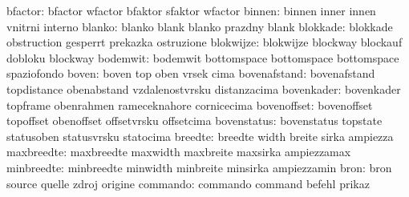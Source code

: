                   bfactor: bfactor                   wfactor
                           bfaktor                   sfaktor
                           wfactor                   %
                   binnen: binnen                    inner
                           innen                     vnitrni
                           interno
                   blanko: blanko                    blank
                           blanko                    prazdny
                           blank                     %
                 blokkade: blokkade                  obstruction
                           gesperrt                  prekazka
                           ostruzione
                blokwijze: blokwijze                 blockway
                           blockauf                  dobloku
                           blockway                  %
                 bodemwit: bodemwit                  bottomspace
                           bottomspace               bottomspace
                           spaziofondo
                    boven: boven                     top
                           oben                      vrsek
                           cima
             bovenafstand: bovenafstand              topdistance
                           obenabstand               vzdalenostvrsku
                           distanzacima
               bovenkader: bovenkader                topframe
                           obenrahmen                rameceknahore
                           cornicecima
              bovenoffset: bovenoffset               topoffset
                           obenoffset                offsetvrsku
                           offsetcima
              bovenstatus: bovenstatus               topstate
                           statusoben                statusvrsku
                           statocima
                  breedte: breedte                   width
                           breite                    sirka
                           ampiezza
               maxbreedte: maxbreedte                maxwidth
                           maxbreite                 maxsirka
                           ampiezzamax
               minbreedte: minbreedte                minwidth
                           minbreite                 minsirka
                           ampiezzamin               %
                     bron: bron                      source
                           quelle                    zdroj
                           origine
                 commando: commando                  command
                           befehl                    prikaz
